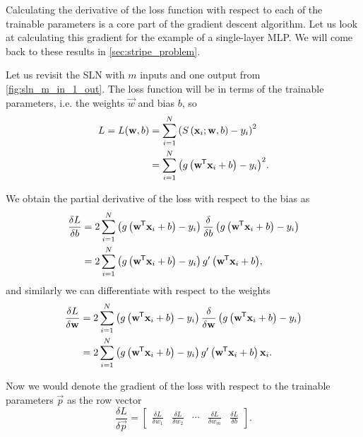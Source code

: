 Calculating the derivative of the loss function with respect to each of the trainable parameters is a core part of the gradient descent algorithm.
Let us look at calculating this gradient for the example of a single-layer MLP. 
We will come back to these results in \ref{sec:stripe_problem}.
\begin{example}
    \label{ex:gradient_single_layer_mlp}
    Let us revisit the SLN with $m$ inputs and one output from \ref{fig:sln_m_in_1_out}.
    The loss function will be in terms of the trainable parameters, i.e. the weights $\vec{w}$ and bias $b$, so
    \begin{align}
        L = L(\mathbf{w}, b)
        &= \sum_{i=1}^N{\left(S\left(\mathbf{x}_i; \mathbf{w}, b\right) - y_i\right)^2} \nonumber \\
        &= \sum_{i=1}^N{\left(g\left(\mathbf{w}^{\mkern-1.5mu\mathsf{T}} \mathbf{x}_i + b\right) - y_i\right)^2}.
    \end{align}

    We obtain the partial derivative of the loss with respect to the bias as
    \begin{align}
        \frac{\delta L}{\delta b}
        &=2 \sum_{i=1}^N{
            \left(g \left(\mathbf{w}^{\mkern-1.5mu\mathsf{T}}\mathbf{x}_i+b\right) - y_i \right)
            \frac{\delta}{\delta b} \left(g \left(\mathbf{w}^{\mkern-1.5mu\mathsf{T}}\mathbf{x}_i+b\right) - y_i \right)
        } \nonumber \\
        &= 2 \sum_{i=1}^N{
            \left(g \left(\mathbf{w}^{\mkern-1.5mu\mathsf{T}}\mathbf{x}_i+b\right) - y_i \right)
            g' \left(\mathbf{w}^{\mkern-1.5mu\mathsf{T}}\mathbf{x}_i+b\right)
        },
    \end{align}
    and similarly we can differentiate with respect to the weights
    \begin{align}
        \frac{\delta L}{\delta \mathbf{w}}
        &= 2 \sum_{i=1}^N{
            \left(g \left(\mathbf{w}^{\mkern-1.5mu\mathsf{T}}\mathbf{x}_i+b\right) - y_i \right)
            \frac{\delta}{\delta \mathbf{w}} \left(g \left(\mathbf{w}^{\mkern-1.5mu\mathsf{T}}\mathbf{x}_i+b\right) - y_i \right)
        } \nonumber \\
        &= 2 \sum_{i=1}^N{
            \left(g \left(\mathbf{w}^{\mkern-1.5mu\mathsf{T}}\mathbf{x}_i+b\right) - y_i \right)
            g' \left(\mathbf{w}^{\mkern-1.5mu\mathsf{T}}\mathbf{x}_i+b\right)
            \mathbf{x}_i
        }.
    \end{align}

    Now we would denote the gradient of the loss with respect to the trainable parameters $\vec{p}$ as the row vector
    \begin{equation*}
        \frac{\delta L}{\delta \vec{p}} = \begin{bmatrix}
            \frac{\delta L}{\delta w_1} &
            \frac{\delta L}{\delta w_2} &
            \cdots &
            \frac{\delta L}{\delta w_m} &
            \frac{\delta L}{\delta b}
        \end{bmatrix}.
    \end{equation*}
\end{example}


